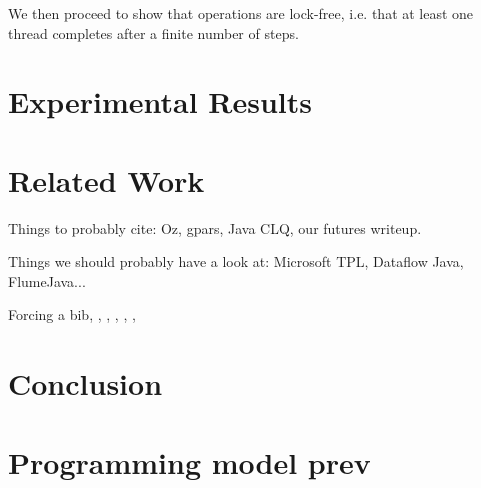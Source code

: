 \documentclass[runningheads,a4paper]{llncs}
\begin{document}
We then proceed to show that operations are lock-free, i.e. that at
least one thread completes after a finite number of steps.


\section{Experimental Results}

\section{Related Work}
Things to probably cite: Oz, gpars, Java CLQ, our futures writeup.

Things we should probably have a look at: Microsoft TPL, Dataflow
Java, FlumeJava...

Forcing a bib, \cite{bowman:reasoning}, \cite{braams:babel}, \cite{clark:pct}, \cite{herlihy:methodology}, \cite{Lamport:LaTeX}, \cite{salas:calculus}
\section{Conclusion}

\section{Programming model prev}
\end{document}
